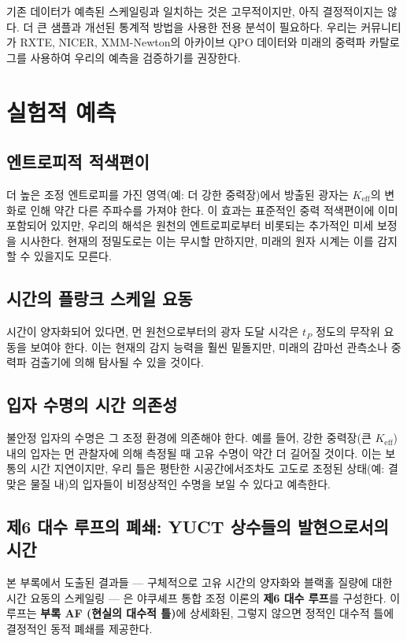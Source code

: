 \documentclass[12pt,a4paper]{article}
\newcommand{\Keff}{K_{\mathrm{eff}}}
\begin{document}
	기존 데이터가 예측된 스케일링과 일치하는 것은 고무적이지만, 아직 결정적이지는 않다. 더 큰 샘플과 개선된 통계적 방법을 사용한 전용 분석이 필요하다. 우리는 커뮤니티가 RXTE, NICER, XMM-Newton의 아카이브 QPO 데이터와 미래의 중력파 카탈로그를 사용하여 우리의 예측을 검증하기를 권장한다.
	
	\section{실험적 예측}
	\label{sec:predictions}
	
	\subsection{엔트로피적 적색편이}
	
	더 높은 조정 엔트로피를 가진 영역(예: 더 강한 중력장)에서 방출된 광자는 \(\Keff\)의 변화로 인해 약간 다른 주파수를 가져야 한다. 이 효과는 표준적인 중력 적색편이에 이미 포함되어 있지만, 우리의 해석은 원천의 엔트로피로부터 비롯되는 추가적인 미세 보정을 시사한다. 현재의 정밀도로는 이는 무시할 만하지만, 미래의 원자 시계는 이를 감지할 수 있을지도 모른다.
	
	\subsection{시간의 플랑크 스케일 요동}
	
	시간이 양자화되어 있다면, 먼 원천으로부터의 광자 도달 시각은 \(t_P\) 정도의 무작위 요동을 보여야 한다. 이는 현재의 감지 능력을 훨씬 밑돌지만, 미래의 감마선 관측소나 중력파 검출기에 의해 탐사될 수 있을 것이다.
	
	\subsection{입자 수명의 시간 의존성}
	
	불안정 입자의 수명은 그 조정 환경에 의존해야 한다. 예를 들어, 강한 중력장(큰 \(\Keff\)) 내의 입자는 먼 관찰자에 의해 측정될 때 고유 수명이 약간 더 길어질 것이다. 이는 보통의 시간 지연이지만, 우리 틀은 평탄한 시공간에서조차도 고도로 조정된 상태(예: 결맞은 물질 내)의 입자들이 비정상적인 수명을 보일 수 있다고 예측한다.
	
	\subsection{제6 대수 루프의 폐쇄: YUCT 상수들의 발현으로서의 시간}
	
	본 부록에서 도출된 결과들 — 구체적으로 고유 시간의 양자화와 블랙홀 질량에 대한 시간 요동의 스케일링 — 은 야쿠셰프 통합 조정 이론의 \textbf{제6 대수 루프}를 구성한다. 이 루프는 \textbf{부록 AF (현실의 대수적 틀)}에 상세화된, 그렇지 않으면 정적인 대수적 틀에 결정적인 동적 폐쇄를 제공한다.
	
\end{document}
